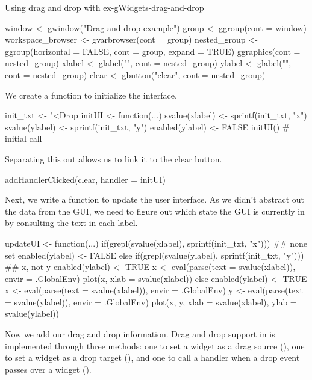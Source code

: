 \begin{example}{Using drag and drop with }{ex-gWidgets-drag-and-drop}
\begin{Schunk}
\begin{Sinput}
 window <- gwindow("Drag and drop example")
 group <- ggroup(cont = window)
 workspace_browser <- gvarbrowser(cont = group)
 nested_group <- ggroup(horizontal = FALSE, cont = group, 
                        expand = TRUE)
 ggraphics(cont = nested_group)
 xlabel <- glabel("", cont = nested_group)
 ylabel <- glabel("", cont = nested_group)
 clear <- gbutton("clear", cont = nested_group)
\end{Sinput}
\end{Schunk}
%
We create a function to initialize the interface.
\begin{Schunk}
\begin{Sinput}
 init_txt <- "<Drop %
 initUI <- function(...) {
   svalue(xlabel) <- sprintf(init_txt, "x")
   svalue(ylabel) <- sprintf(init_txt, "y")
   enabled(ylabel) <- FALSE
 }
 initUI()                                # initial call
\end{Sinput}
\end{Schunk}
%
Separating this out allows us to link it to the clear button.
\begin{Schunk}
\begin{Sinput}
 addHandlerClicked(clear, handler = initUI)
\end{Sinput}
\end{Schunk}
%
Next, we write a function to update the user interface. As we didn't
abstract out the data from the GUI, we need to figure out which state
the GUI is currently in by consulting the text in each
label.
\begin{Schunk}
\begin{Sinput}
 updateUI <- function(...) {
   if(grepl(svalue(xlabel), sprintf(init_txt, "x"))) {
     ## none set
     enabled(ylabel) <- FALSE
   } else if(grepl(svalue(ylabel), sprintf(init_txt, "y"))) {
     ## x, not y
     enabled(ylabel) <- TRUE
     x <- eval(parse(text = svalue(xlabel)), envir = .GlobalEnv)
     plot(x, xlab = svalue(xlabel))
   } else {
     enabled(ylabel) <- TRUE    
     x <- eval(parse(text = svalue(xlabel)), envir = .GlobalEnv)
     y <- eval(parse(text = svalue(ylabel)), envir = .GlobalEnv)
     plot(x, y, xlab = svalue(xlabel), ylab = svalue(ylabel))
   }
 }
\end{Sinput}
\end{Schunk}

Now we add our drag and drop information.  Drag and drop support in
 is implemented through three methods: one to set a
widget as a drag source (), one to set a widget
as a drop target (), and one to call a handler
when a drop event passes over a widget ().
  

\end{example}
